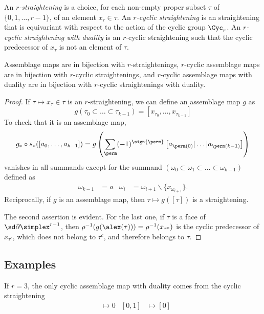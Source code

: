 \begin{definition}
	An \emph{$r$-straightening} is a choice, for each non-empty proper subset $\tau$ of $\{0,1,\dots,r-1\}$, of an element $x_\tau\in \tau$. An \emph{$r$-cyclic straightening} is an straightening that is equivariant with respect to the action of the cyclic group $\Cyc_r$. An \emph{$r$-cyclic straightening with duality} is an $r$-cyclic straightening such that the cyclic predecessor of $x_\tau$ is not an element of $\tau$.
\end{definition}

\begin{proposition}\label{prop:straightenings}
	Assemblage maps are in bijection with $r$-straightenings, $r$-cyclic assemblage maps are in bijection with $r$-cyclic straightenings, and $r$-cyclic assemblage maps with duality are in bijection with $r$-cyclic straightenings with duality.
\end{proposition}

\begin{proof}
	If $\tau\mapsto x_{\tau}\in \tau$ is an $r$-straightening, we can define an assemblage map $g$ as
	\[
	g(\tau_0\subset\dots\subset\tau_{k-1}) = [x_{\tau_0},\dots,x_{\tau_{k-1}}]
	\]
	To check that it is an assemblage map,
	\[
	g_*\circ s_*([a_0,\dots,a_{k-1}]) = g\left(\sum_{\perm} (-1)^{\sign{\perm}} \left[a_{\perm(0)}|\dots|a_{\perm(k-1)}\right]\right)
	\]
	vanishes in all summands except for the summand $(\omega_0 \subset \omega_1 \subset \dots \subset \omega_{k-1})$ defined as
	\begin{align*}
		\omega_{k-1} &= a
		&
		\omega_{i} &= \omega_{i+1}\smallsetminus \{x_{\omega_{i+1}}\}.
	\end{align*}
	Reciprocally, if $g$ is an assemblage map, then $\tau\mapsto g([\tau])$ is a straightening.
	
	The second assertion is evident. For the last one, if $\tau$ is a face of $\sd \partial \simplex^{r-1}$, then $\rho^{-1}(g(\alex(\tau))) = \rho^{-1}(x_{\tau^c})$ is the cyclic predecessor of $x_{\tau^c}$, which does not belong to $\tau^c$, and therefore belongs to $\tau$.
\end{proof}

\subsection{Examples}

\begin{example}
	If $r=3$, the only cyclic assemblage map with duality comes from the cyclic straightening
	\begin{align*}
		[0]&\mapsto 0 & [0,1]&\mapsto [0]
	\end{align*}
\end{example}

